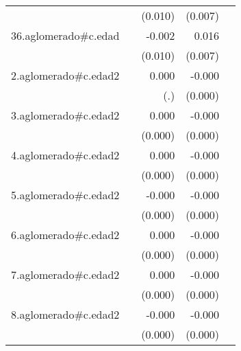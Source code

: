 {\begin{longtable}{l*{4}{D{.}{.}{-1}}}
            &                     &     (0.010)         &     (0.007)         &                     \\
\addlinespace
36.aglomerado#c.edad&                     &      -0.002         &       0.016\sym{*}  &                     \\
            &                     &     (0.010)         &     (0.007)         &                     \\
\addlinespace
2.aglomerado#c.edad2&                     &       0.000         &      -0.000\sym{*}  &                     \\
            &                     &         (.)         &     (0.000)         &                     \\
\addlinespace
3.aglomerado#c.edad2&                     &       0.000         &      -0.000\sym{***}&                     \\
            &                     &     (0.000)         &     (0.000)         &                     \\
\addlinespace
4.aglomerado#c.edad2&                     &       0.000         &      -0.000\sym{*}  &                     \\
            &                     &     (0.000)         &     (0.000)         &                     \\
\addlinespace
5.aglomerado#c.edad2&                     &      -0.000         &      -0.000\sym{*}  &                     \\
            &                     &     (0.000)         &     (0.000)         &                     \\
\addlinespace
6.aglomerado#c.edad2&                     &       0.000         &      -0.000         &                     \\
            &                     &     (0.000)         &     (0.000)         &                     \\
\addlinespace
7.aglomerado#c.edad2&                     &       0.000         &      -0.000\sym{*}  &                     \\
            &                     &     (0.000)         &     (0.000)         &                     \\
\addlinespace
8.aglomerado#c.edad2&                     &      -0.000         &      -0.000         &                     \\
            &                     &     (0.000)         &     (0.000)         &                     \\

\end{longtable}}
